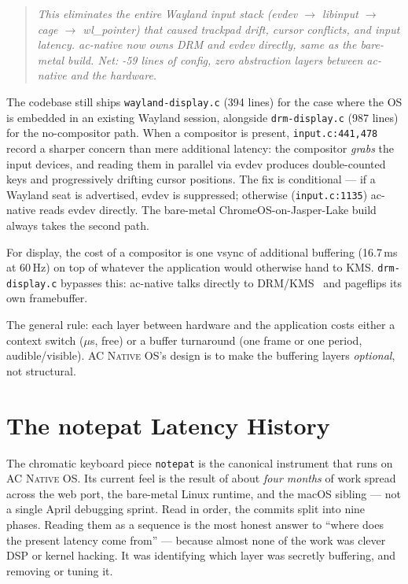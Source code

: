 \documentclass[10pt,letterpaper,twocolumn]{article}
\newcommand{\acos}{\textsc{AC Native OS}}
\begin{document}
\begin{quote}\small\itshape
This eliminates the entire Wayland input stack (evdev $\rightarrow$ libinput $\rightarrow$ cage $\rightarrow$ wl\_pointer) that caused trackpad drift, cursor conflicts, and input latency. ac-native now owns DRM and evdev directly, same as the bare-metal build. Net: -59 lines of config, zero abstraction layers between ac-native and the hardware.
\end{quote}

The codebase still ships \texttt{wayland-display.c} (394 lines) for the case where the OS is embedded in an existing Wayland session, alongside \texttt{drm-display.c} (987 lines) for the no-compositor path. When a compositor is present, \texttt{input.c:441,478} record a sharper concern than mere additional latency: the compositor \emph{grabs} the input devices, and reading them in parallel via evdev produces double-counted keys and progressively drifting cursor positions. The fix is conditional --- if a Wayland seat is advertised, evdev is suppressed; otherwise (\texttt{input.c:1135}) ac-native reads evdev directly. The bare-metal ChromeOS-on-Jasper-Lake build always takes the second path.

For display, the cost of a compositor is one vsync of additional buffering (16.7\,ms at 60\,Hz) on top of whatever the application would otherwise hand to KMS. \texttt{drm-display.c} bypasses this: ac-native talks directly to DRM/KMS~\citep{drmkms} and pageflips its own framebuffer.

The general rule: each layer between hardware and the application costs either a context switch ($\mu$s, free) or a buffer turnaround (one frame or one period, audible/visible). \acos{}'s design is to make the buffering layers \emph{optional}, not structural.


\section{The notepat Latency History}
\label{sec:history}

The chromatic keyboard piece \texttt{notepat} is the canonical instrument that runs on \acos{}. Its current feel is the result of about \emph{four months} of work spread across the web port, the bare-metal Linux runtime, and the macOS sibling --- not a single April debugging sprint. Read in order, the commits split into nine phases. Reading them as a sequence is the most honest answer to ``where does the present latency come from'' --- because almost none of the work was clever DSP or kernel hacking. It was identifying which layer was secretly buffering, and removing or tuning it.
\end{document}
